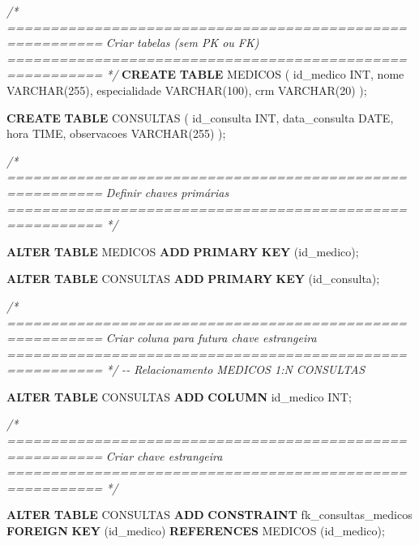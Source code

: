 \documentclass[
]{book}
\newenvironment{Shaded}{\begin{snugshade}}{\end{snugshade}}
\newcommand{\CommentTok}[1]{\textcolor[rgb]{0.56,0.35,0.01}{\textit{#1}}}
\newcommand{\DataTypeTok}[1]{\textcolor[rgb]{0.13,0.29,0.53}{#1}}
\newcommand{\DecValTok}[1]{\textcolor[rgb]{0.00,0.00,0.81}{#1}}
\newcommand{\KeywordTok}[1]{\textcolor[rgb]{0.13,0.29,0.53}{\textbf{#1}}}
\newcommand{\NormalTok}[1]{#1}
\begin{document}
\begin{Shaded}
\begin{Highlighting}[]
\CommentTok{/* =========================================================}
\CommentTok{   Criar tabelas (sem PK ou FK)}
\CommentTok{   ========================================================= */}
\KeywordTok{CREATE} \KeywordTok{TABLE}\NormalTok{ MEDICOS }
\NormalTok{(}
\NormalTok{    id\_medico }\DataTypeTok{INT}\NormalTok{,}
\NormalTok{    nome }\DataTypeTok{VARCHAR}\NormalTok{(}\DecValTok{255}\NormalTok{),}
\NormalTok{    especialidade }\DataTypeTok{VARCHAR}\NormalTok{(}\DecValTok{100}\NormalTok{),}
\NormalTok{    crm }\DataTypeTok{VARCHAR}\NormalTok{(}\DecValTok{20}\NormalTok{)}
\NormalTok{);}

\KeywordTok{CREATE} \KeywordTok{TABLE}\NormalTok{ CONSULTAS }
\NormalTok{(}
\NormalTok{    id\_consulta }\DataTypeTok{INT}\NormalTok{,}
\NormalTok{    data\_consulta }\DataTypeTok{DATE}\NormalTok{,}
\NormalTok{    hora }\DataTypeTok{TIME}\NormalTok{,}
\NormalTok{    observacoes }\DataTypeTok{VARCHAR}\NormalTok{(}\DecValTok{255}\NormalTok{)}
\NormalTok{);}

\CommentTok{/* =========================================================}
\CommentTok{   Definir chaves primárias}
\CommentTok{   ========================================================= */}

\KeywordTok{ALTER} \KeywordTok{TABLE}\NormalTok{ MEDICOS }\KeywordTok{ADD} \KeywordTok{PRIMARY} \KeywordTok{KEY}\NormalTok{ (id\_medico);}

\KeywordTok{ALTER} \KeywordTok{TABLE}\NormalTok{ CONSULTAS }\KeywordTok{ADD} \KeywordTok{PRIMARY} \KeywordTok{KEY}\NormalTok{ (id\_consulta);}

\CommentTok{/* =========================================================}
\CommentTok{   Criar coluna para futura chave estrangeira}
\CommentTok{   ========================================================= */}
\CommentTok{{-}{-} Relacionamento MEDICOS 1:N CONSULTAS}

\KeywordTok{ALTER} \KeywordTok{TABLE}\NormalTok{ CONSULTAS }\KeywordTok{ADD} \KeywordTok{COLUMN}\NormalTok{ id\_medico }\DataTypeTok{INT}\NormalTok{;}

\CommentTok{/* =========================================================}
\CommentTok{   Criar chave estrangeira}
\CommentTok{   ========================================================= */}

\KeywordTok{ALTER} \KeywordTok{TABLE}\NormalTok{ CONSULTAS }\KeywordTok{ADD} \KeywordTok{CONSTRAINT}\NormalTok{ fk\_consultas\_medicos }\KeywordTok{FOREIGN} \KeywordTok{KEY}\NormalTok{ (id\_medico) }\KeywordTok{REFERENCES}\NormalTok{ MEDICOS (id\_medico);}
\end{Highlighting}
\end{Shaded}
\end{document}
